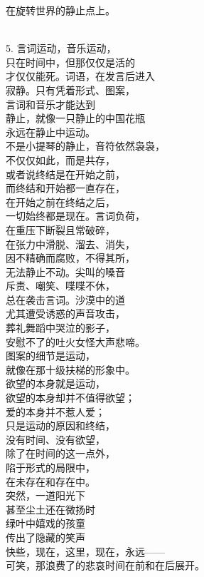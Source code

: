 \documentclass{article}
\begin{document}
在旋转世界的静止点上。 \par \\
5. 言词运动，音乐运动，\\
只在时间中，但那仅仅是活的\\
才仅仅能死。词语，在发言后进入\\
寂静。只有凭着形式、图案，\\
言词和音乐才能达到\\
静止，就像一只静止的中国花瓶\\
永远在静止中运动。\\
不是小提琴的静止，音符依然袅袅，\\
不仅仅如此，而是共存，\\
或者说终结是在开始之前，\\
而终结和开始都一直存在，\\
在开始之前在终结之后，\\
一切始终都是现在。言词负荷，\\
在重压下断裂且常破碎，
\newpage
\\
在张力中滑脱、溜去、消失，\\
因不精确而腐败，不得其所，\\
无法静止不动。尖叫的嗓音\\
斥责、嘲笑、喋喋不休，\\
总在袭击言词。沙漠中的道\\
尤其遭受诱惑的声音攻击，\\
葬礼舞蹈中哭泣的影子，\\
安慰不了的吐火女怪大声悲啼。\\
图案的细节是运动，\\
就像在那十级扶梯的形象中。\\
欲望的本身就是运动，\\
欲望的本身却并不值得欲望；\\
爱的本身并不惹人爱；\\
只是运动的原因和终结，\\
没有时间、没有欲望，\\
除了在时间的这一点外，\\
陷于形式的局限中，\\
在未存在和存在中。\\
突然，一道阳光下\\
甚至尘土还在微扬时\\
绿叶中嬉戏的孩童
\newpage
\\
传出了隐藏的笑声\\
快些，现在，这里，现在，永远——\\
可笑，那浪费了的悲哀时间在前和在后展开。
\end{document}
